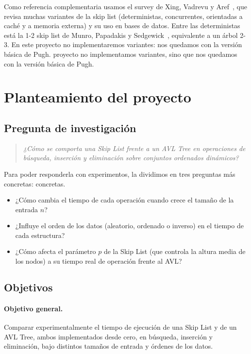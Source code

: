 \documentclass[11pt,a4paper]{article}
\begin{document}
Como referencia complementaria usamos el survey de Xing, Vadrevu y
Aref~\cite{vadrevu2024}, que revisa muchas variantes de la skip list
(deterministas, concurrentes, orientadas a caché y a memoria externa) y su uso
en bases de datos. Entre las deterministas está la 1-2 skip list de Munro,
Papadakis y Sedgewick~\cite{munro1992}, equivalente a un árbol 2-3. En este
proyecto no implementaremos variantes: nos quedamos con la versión básica de
Pugh.
proyecto no implementamos variantes, sino que nos quedamos con la versión
básica de Pugh.

\section{Planteamiento del proyecto}\label{sec:plan}

\subsection{Pregunta de investigación}

\begin{quote}
\itshape
¿Cómo se comporta una Skip List frente a un AVL Tree en operaciones de
búsqueda, inserción y eliminación sobre conjuntos ordenados dinámicos?
\end{quote}

Para poder responderla con experimentos, la dividimos en tres preguntas más
concretas:
concretas.
\begin{itemize}
  \item[\textbf{P1.}] ¿Cómo cambia el tiempo de cada operación cuando crece el
  tamaño de la entrada $n$?
  \item[\textbf{P2.}] ¿Influye el orden de los datos (aleatorio, ordenado o
  inverso) en el tiempo de cada estructura?
  \item[\textbf{P3.}] ¿Cómo afecta el parámetro $p$ de la Skip List (que
  controla la altura media de los nodos) a su tiempo real de operación frente
  al AVL?
\end{itemize}

\subsection{Objetivos}

\paragraph{Objetivo general.}
Comparar experimentalmente el tiempo de ejecución de una Skip List y de un AVL
Tree, ambos implementados desde cero, en búsqueda, inserción y eliminación,
bajo distintos tamaños de entrada y órdenes de los datos.
\end{document}
